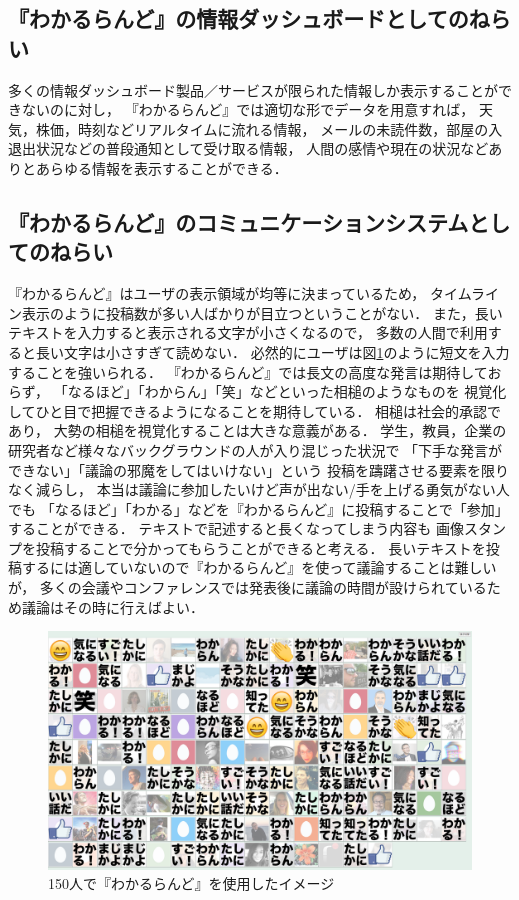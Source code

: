\subsection{『わかるらんど』の情報ダッシュボードとしてのねらい}

多くの情報ダッシュボード製品／サービスが限られた情報しか表示することができないのに対し，
『わかるらんど』では適切な形でデータを用意すれば，
天気，株価，時刻などリアルタイムに流れる情報，
メールの未読件数，部屋の入退出状況などの普段通知として受け取る情報，
人間の感情や現在の状況などありとあらゆる情報を表示することができる．


\subsection{『わかるらんど』のコミュニケーションシステムとしてのねらい}
\label{nerai}

『わかるらんど』はユーザの表示領域が均等に決まっているため，
タイムライン表示のように投稿数が多い人ばかりが目立つということがない．
また，長いテキストを入力すると表示される文字が小さくなるので，
多数の人間で利用すると長い文字は小さすぎて読めない．
必然的にユーザは図\ref{wakaruland150}のように短文を入力することを強いられる．
『わかるらんど』では長文の高度な発言は期待しておらず，
「なるほど」「わからん」「笑」などといった相槌のようなものを
視覚化してひと目で把握できるようになることを期待している．
相槌は社会的承認であり\cite{130001611628}，
大勢の相槌を視覚化することは大きな意義がある．
学生，教員，企業の研究者など様々なバックグラウンドの人が入り混じった状況で
「下手な発言ができない」「議論の邪魔をしてはいけない」という
投稿を躊躇させる要素を限りなく減らし，
本当は議論に参加したいけど声が出ない/手を上げる勇気がない人でも
「なるほど」「わかる」などを『わかるらんど』に投稿することで「参加」することができる．
テキストで記述すると長くなってしまう内容も
画像スタンプを投稿することで分かってもらうことができると考える．
長いテキストを投稿するには適していないので『わかるらんど』を使って議論することは難しいが，
多くの会議やコンファレンスでは発表後に議論の時間が設けられているため議論はその時に行えばよい．

\begin{figure}[H]
\centering
\includegraphics[width=12cm]{images/wakaruland150.png}
\caption{150人で『わかるらんど』を使用したイメージ}
\label{wakaruland150}
\end{figure}